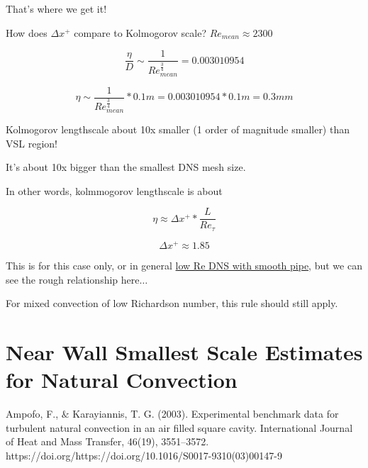 \documentclass[12pt]{article}
\renewcommand{\_}{\kern-1.5pt\textunderscore\kern-1.5pt}
\begin{document}
That’s where we get it!\par


\vspace{\baselineskip}
How does  \(  \Delta x^{+} \)  compare to Kolmogorov scale?  \( Re_{mean} \approx 2300 \) \par

 \[ \frac{ \eta }{D} \sim \frac{1}{Re_{mean}^{\frac{3}{4}}}=0.003010954  \] \par


\vspace{\baselineskip}
 \[  \eta  \sim \frac{1}{Re_{mean}^{\frac{3}{4}}}\ast0.1m=0.003010954\ast0.1m=0.3mm \] \par


\vspace{\baselineskip}
Kolmogorov lengthscale about 10x smaller (1 order of magnitude smaller) than VSL region! \par

It’s about 10x bigger than the smallest DNS mesh size.\par


\vspace{\baselineskip}
In other words, kolmmogorov lengthscale is about \par

 \[  \eta  \approx  \Delta x^{+}\ast\frac{L}{Re_{ \tau}} \] \par

 \[  \Delta x^{+} \approx 1.85 \] \par

This is for this case only, or in general \uline{low Re DNS with smooth pipe}, but we can see the rough relationship here$ \ldots $ \par


\vspace{\baselineskip}
For mixed convection of low Richardson number, this rule should still apply.\par

\section{Near Wall Smallest Scale Estimates for Natural Convection}
Ampofo, F., $\&$  Karayiannis, T. G. (2003). Experimental benchmark data for turbulent natural convection in an air filled square cavity. International Journal of Heat and Mass Transfer, 46(19), 3551–3572. https://doi.org/https://doi.org/10.1016/S0017-9310(03)00147-9\par
\end{document}
